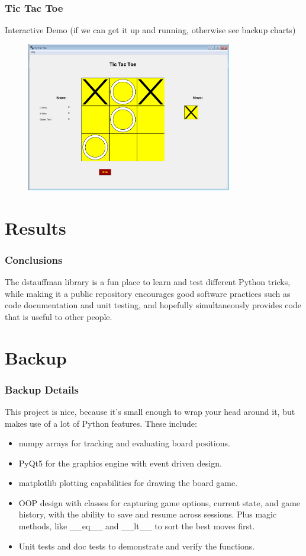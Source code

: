 \documentclass{beamer}
\begin{document}
\begin{frame}
	\frametitle{Tic Tac Toe}
    Interactive Demo (if we can get it up and running, otherwise see backup charts)
    \begin{figure}
        \centering
        \includegraphics[width=0.8\textwidth]{TicTacToe_Board.png}
    \end{figure}
\end{frame}

\section{Results}
\begin{frame}
	\frametitle{Conclusions}
    The dstauffman library is a fun place to learn and test different Python tricks, while making it a public repository encourages good software practices such as code documentation and unit testing, and hopefully simultaneously provides code that is useful to other people.
\end{frame}

\section{Backup}
\frame{\sectionpage}

\begin{frame}
	\frametitle{Backup Details}
	This project is nice, because it's small enough to wrap your head around it, but makes use of a lot of Python features.  These include:
	\begin{itemize}
		\item numpy arrays for tracking and evaluating board positions.
		\item PyQt5 for the graphics engine with event driven design.
		\item matplotlib plotting capabilities for drawing the board game.
		\item OOP design with classes for capturing game options, current state, and game history, with the ability to save and resume across sessions.  Plus magic methods, like \_\_eq\_\_ and \_\_lt\_\_  to sort the best moves first.
		\item Unit tests and doc tests to demonstrate and verify the functions.
	\end{itemize}
\end{frame}
\end{document}
